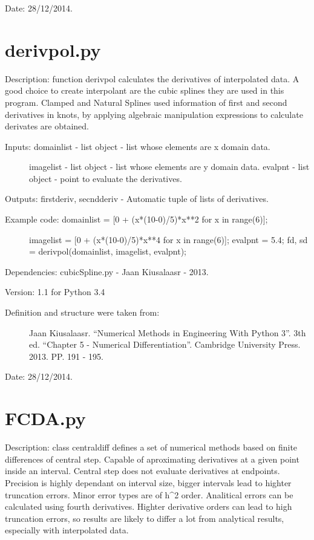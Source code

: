 \documentclass[letterpaper,10pt,oneside]{sphinxmanual}
\theoremstyle{plain}%
\theoremstyle{definition}%
\theoremstyle{remark}%
\begin{document}
Date: 28/12/2014.


\section{derivpol.py}
\label{code:module-derivpol}\label{code:derivpol-py}
Description: function derivpol calculates the derivatives of interpolated
data. A good choice to create interpolant are the cubic splines they are
used in this program. Clamped and Natural Splines used information of
first and second derivatives in knots, by applying algebraic manipulation
expressions to calculate derivates are obtained.
\begin{description}
\item[{Inputs: domainlist - list object - list whose elements are x domain data.}] \leavevmode
imagelist - list object - list whose elements are y domain data.
evalpnt - list object - point to evaluate the derivatives.

\end{description}

Outputs: firstderiv, secndderiv - Automatic tuple of lists of derivatives.
\begin{description}
\item[{Example code: domainlist = {[}0 + (x*(10-0)/5)*x**2 for x in range(6){]};}] \leavevmode
imagelist = {[}0 + (x*(10-0)/5)*x**4 for x in range(6){]};
evalpnt = 5.4;
fd, sd = derivpol(domainlist, imagelist, evalpnt);

\end{description}

Dependencies: cubicSpline.py - Jaan Kiusalaasr - 2013.

Version: 1.1 for Python 3.4
\begin{description}
\item[{Definition and structure were taken from:}] \leavevmode
Jaan Kiusalaasr. ``Numerical Methods in Engineering With Python 3''.
3th ed. ``Chapter 5 - Numerical Differentiation''. 
Cambridge University Press. 2013. PP. 191 - 195.

\end{description}




Date: 28/12/2014.


\section{FCDA.py}
\label{code:module-FCDA}\label{code:fcda-py}
Description: class centraldiff defines a set of numerical methods based on
finite differences of central step. Capable of aproximating derivatives at
a given point inside an interval. Central step does not evaluate derivatives
at endpoints. Precision is highly dependant on interval size, bigger intervals
lead to highter truncation errors. Minor error types are of h\textasciicircum{}2 order.
Analitical errors can be calculated using fourth derivatives. Highter
derivative orders can lead to high truncation errors, so results are likely
to differ a lot from analytical results, especially with interpolated data.
\end{document}
